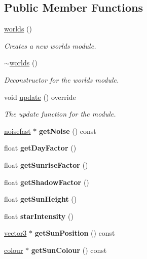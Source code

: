 \subsection*{Public Member Functions}
\begin{DoxyCompactItemize}
\item 
\hyperlink{classflounder_1_1worlds_af62d72f1ecead18a054ad8b8933a87eb}{worlds} ()
\begin{DoxyCompactList}\small\item\em Creates a new worlds module. \end{DoxyCompactList}\item 
\hyperlink{classflounder_1_1worlds_aec7eb730e473ffecbbd4d722b1d34a5b}{$\sim$worlds} ()
\begin{DoxyCompactList}\small\item\em Deconstructor for the worlds module. \end{DoxyCompactList}\item 
void \hyperlink{classflounder_1_1worlds_af1cdfac9ca2a2fc2768a9db4c1c22967}{update} () override
\begin{DoxyCompactList}\small\item\em The update function for the module. \end{DoxyCompactList}\item 
\mbox{\label{classflounder_1_1worlds_ad923bc9258a2b47b5d2ebbe5cb017c13}} 
\hyperlink{classnoisefast}{noisefast} $\ast$ {\bfseries get\+Noise} () const
\item 
\mbox{\label{classflounder_1_1worlds_ac69fb5fdb6b4037f75d8c91af936aad0}} 
float {\bfseries get\+Day\+Factor} ()
\item 
\mbox{\label{classflounder_1_1worlds_a6d9430b7e2059e9e8e92720d44a2817d}} 
float {\bfseries get\+Sunrise\+Factor} ()
\item 
\mbox{\label{classflounder_1_1worlds_a8d27f212b7786e4c9f052983e909d0b0}} 
float {\bfseries get\+Shadow\+Factor} ()
\item 
\mbox{\label{classflounder_1_1worlds_ae8bd9b837d94b7f8915215a63a058d8b}} 
float {\bfseries get\+Sun\+Height} ()
\item 
\mbox{\label{classflounder_1_1worlds_a10fe2e951680d004ec0fb0af8f336e41}} 
float {\bfseries star\+Intensity} ()
\item 
\mbox{\label{classflounder_1_1worlds_aa9226e458eccc1cb8aaea8114cb149ef}} 
\hyperlink{classflounder_1_1vector3}{vector3} $\ast$ {\bfseries get\+Sun\+Position} () const
\item 
\mbox{\label{classflounder_1_1worlds_a55a8e29da6874b2bac81b44ba073dd6c}} 
\hyperlink{classflounder_1_1colour}{colour} $\ast$ {\bfseries get\+Sun\+Colour} () const
\end{DoxyCompactItemize}
